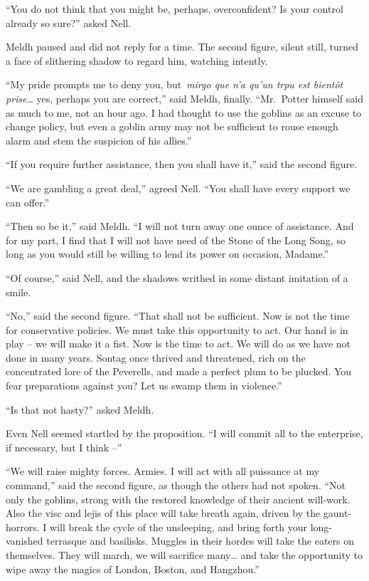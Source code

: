 ``You do not think that you might be, perhaps, overconfident? Is your
control already so sure?'' asked Nell.

Meldh paused and did not reply for a time. The second figure, silent
still, turned a face of slithering shadow to regard him, watching
intently.

``My pride prompts me to deny you, but~\emph{mirgo que n'a qu'un trpu
est bientôt prise}\ldots{} yes, perhaps you are correct,'' said Meldh,
finally. ``Mr.~Potter himself said as much to me, not an hour ago. I had
thought to use the goblins as an excuse to change policy, but even a
goblin army may not be sufficient to rouse enough alarm and stem the
suspicion of his allies.''

``If you require further assistance, then you shall have it,'' said the
second figure.

``We are gambling a great deal,'' agreed Nell. ``You shall have every
support we can offer.''

``Then so be it,'' said Meldh. ``I will not turn away one ounce of
assistance. And for my part, I find that I will not have need of the
Stone of the Long Song, so long as you would still be willing to lend
its power on occasion, Madame.''

``Of course,'' said Nell, and the shadows writhed in some distant
imitation of a smile.

``No,'' said the second figure. ``That shall not be sufficient. Now is
not the time for conservative policies. We must take this opportunity to
act. Our hand is in play -- we will make it a fist. Now is the time to
act. We will do as we have not done in many years. Sontag once thrived
and threatened, rich on the concentrated lore of the Peverells, and made
a perfect plum to be plucked. You fear preparations against you? Let us
swamp them in violence.''

``Is that not hasty?'' asked Meldh.

Even Nell seemed startled by the proposition. ``I will commit all to the
enterprise, if necessary, but I think --''

``We will raise mighty forces. Armies. I will act with all puissance at
my command,'' said the second figure, as though the others had not
spoken. ``Not only the goblins, strong with the restored knowledge of
their ancient will-work. Also the visc and lejis of this place will take
breath again, driven by the gaunt-horrors. I will break the cycle of the
unsleeping, and bring forth your long-vanished terrasque and basilisks.
Muggles in their hordes will take the eaters on themselves. They will
march, we will sacrifice many\ldots{} and take the opportunity to wipe
away the magics of London, Boston, and Hangzhou.''

